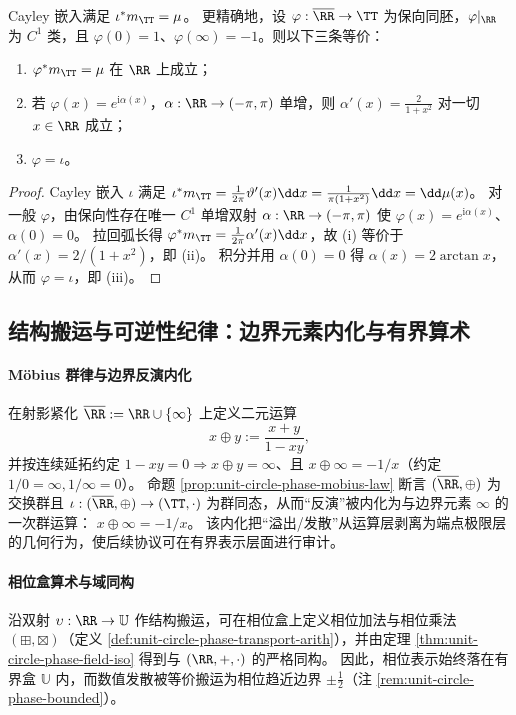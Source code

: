 \begin{theorem}\label{thm:haar-pullback-uniqueness}
Cayley 嵌入满足 \(\iota^*m_{\TT}=\mu\)。
更精确地，设 \(\varphi:\overline{\RR}\to\TT\) 为保向同胚，\(\varphi|_{\RR}\) 为 \(C^1\) 类，且 \(\varphi(0)=1\)、\(\varphi(\infty)=-1\)。则以下三条等价：
\begin{enumerate}
  \item \(\varphi^*m_{\TT}=\mu\) 在 \(\RR\) 上成立；
  \item 若 \(\varphi(x)=e^{\mathrm{i}\alpha(x)}\)，\(\alpha:\RR\to(-\pi,\pi)\) 单增，则 \(\alpha'(x)=\frac{2}{1+x^2}\) 对一切 \(x\in\RR\) 成立；
  \item \(\varphi=\iota\)。
\end{enumerate}
\end{theorem}

\begin{proof}
Cayley 嵌入 \(\iota\) 满足 \(\iota^*m_{\TT}=\frac{1}{2\pi}\vartheta'(x)\dd x=\frac{1}{\pi(1+x^2)}\dd x=\dd\mu(x)\)。
对一般 \(\varphi\)，由保向性存在唯一 \(C^1\) 单增双射 \(\alpha:\RR\to(-\pi,\pi)\) 使 \(\varphi(x)=e^{\mathrm{i}\alpha(x)}\)、\(\alpha(0)=0\)。
拉回弧长得 \(\varphi^*m_{\TT}=\frac{1}{2\pi}\alpha'(x)\dd x\)，故 (i) 等价于 \(\alpha'(x)=2/(1+x^2)\)，即 (ii)。
积分并用 \(\alpha(0)=0\) 得 \(\alpha(x)=2\arctan x\)，从而 \(\varphi=\iota\)，即 (iii)。
\end{proof}

\subsection{结构搬运与可逆性纪律：边界元素内化与有界算术}\label{subsec:cdim-transport-and-reversibility}
\paragraph{Möbius 群律与边界反演内化}
在射影紧化 \(\overline{\RR}:=\RR\cup\{\infty\}\) 上定义二元运算
\[
x\oplus y:=\frac{x+y}{1-xy},
\]
并按连续延拓约定 \(1-xy=0\Rightarrow x\oplus y=\infty\)、且 \(x\oplus\infty=-1/x\)（约定 \(1/0=\infty,1/\infty=0\)）。
命题 \ref{prop:unit-circle-phase-mobius-law} 断言 \((\overline{\RR},\oplus)\) 为交换群且 \(\iota:(\overline{\RR},\oplus)\to(\TT,\cdot)\) 为群同态，从而“反演”被内化为与边界元素 \(\infty\) 的一次群运算：
\(
x\oplus\infty=-1/x
\)。
该内化把“溢出/发散”从运算层剥离为端点极限层的几何行为，使后续协议可在有界表示层面进行审计。

\paragraph{相位盒算术与域同构}
沿双射 \(\upsilon:\RR\to\mathbb{U}\) 作结构搬运，可在相位盒上定义相位加法与相位乘法 \((\boxplus,\boxtimes)\)（定义 \ref{def:unit-circle-phase-transport-arith}），并由定理 \ref{thm:unit-circle-phase-field-iso} 得到与 \((\RR,+,\cdot)\) 的严格同构。
因此，相位表示始终落在有界盒 \(\mathbb{U}\) 内，而数值发散被等价搬运为相位趋近边界 \(\pm\tfrac12\)（注 \ref{rem:unit-circle-phase-bounded}）。


